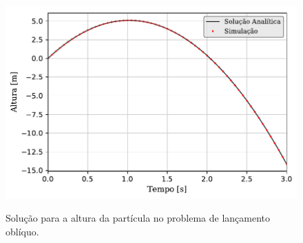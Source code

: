 \begin{figure}[htb!]
	\caption{Solução para a altura da partícula no problema de lançamento oblíquo\protect\footnotemark.}
	\centering
		\includegraphics[scale=1]{images/falling_sphere/correct_initial_acceleration/y_position.pdf}
	\label{fig:falling_sphere_y_position}
	\sourceMe
	\vspace{-0.3cm}
\end{figure}


